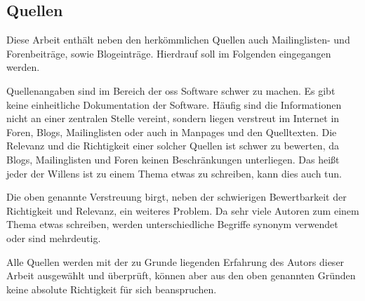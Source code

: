 \subsection{Quellen}
Diese Arbeit enthält neben den herkömmlichen Quellen auch Mailinglisten- und Forenbeiträge, sowie Blogeinträge. Hierdrauf soll im Folgenden eingegangen werden.

Quellenangaben sind im Bereich der \gls{oss} Software schwer zu machen. Es gibt keine einheitliche Dokumentation der Software. Häufig sind die Informationen nicht an einer zentralen Stelle vereint, sondern liegen verstreut im Internet in Foren, Blogs, Mailinglisten oder auch in Manpages und den Quelltexten. Die Relevanz und die Richtigkeit einer solcher Quellen ist schwer zu bewerten, da Blogs, Mailinglisten und Foren keinen Beschränkungen unterliegen. Das heißt jeder der Willens ist zu einem Thema etwas zu schreiben, kann dies auch tun.

Die oben genannte Verstreuung birgt, neben der schwierigen Bewertbarkeit der Richtigkeit und Relevanz, ein weiteres Problem. Da sehr viele Autoren zum einem Thema etwas schreiben, werden unterschiedliche Begriffe synonym verwendet oder sind mehrdeutig.

Alle Quellen werden mit der zu Grunde liegenden Erfahrung des Autors dieser Arbeit ausgewählt und überprüft, können aber aus den oben genannten Gründen keine absolute Richtigkeit für sich beanspruchen.
